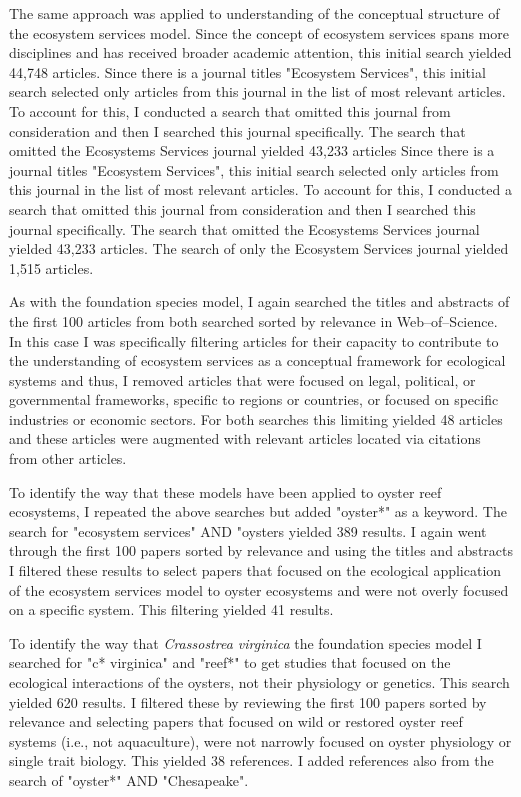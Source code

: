 \documentclass{article}
\begin{document}
The same approach was applied to understanding of the conceptual structure of the ecosystem services model. Since the concept of ecosystem services spans more disciplines and has received broader academic attention, this initial search yielded 44,748 articles. Since there is a journal titles "Ecosystem Services", this initial search selected only articles from this journal in the list of most relevant articles. To account for this, I conducted a search that omitted this journal from consideration and then I searched this journal specifically. The search that omitted the Ecosystems Services journal yielded 43,233 articles Since there is a journal titles "Ecosystem Services", this initial search selected only articles from this journal in the list of most relevant articles. To account for this, I conducted a search that omitted this journal from consideration and then I searched this journal specifically. The search that omitted the Ecosystems Services journal yielded 43,233 articles. The search of only the Ecosystem Services journal yielded 1,515 articles.  

As with the foundation species model, I again searched the titles and abstracts of the first 100 articles from both searched sorted by relevance in Web--of--Science. In this case I was specifically filtering articles for their capacity to contribute to the understanding of ecosystem services as a conceptual framework for ecological systems and thus, I removed articles that were focused on legal, political, or governmental frameworks, specific to regions or countries, or focused on specific industries or economic sectors. For both searches this limiting yielded 48 articles and these articles were augmented with relevant articles located via citations from other articles.

To identify the way that these models have been applied to oyster reef ecosystems, I repeated the above searches but added "oyster*" as a keyword. The search for "ecosystem services" AND "oysters yielded 389 results. I again went through the first 100 papers sorted by relevance and using the titles and abstracts I filtered these results to select papers that focused on the ecological application of the ecosystem services model to oyster ecosystems and were not overly focused on a specific system. This filtering yielded 41 results.

To identify the way that \emph{Crassostrea virginica} the foundation species model I searched for "c* virginica" and "reef*" to get studies that focused on the ecological interactions of the oysters, not their physiology or genetics. This search yielded 620 results. I filtered these by reviewing the first 100 papers sorted by relevance and selecting papers that focused on wild or restored oyster reef systems (i.e., not aquaculture), were not narrowly focused on oyster physiology or single trait biology. This yielded 38 references. I added references also from the search of "oyster*" AND "Chesapeake". 
\end{document}
